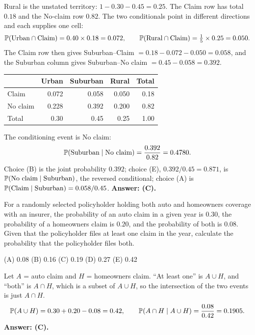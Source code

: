 \begin{solution}
Rural is the unstated territory: $1 - 0.30 - 0.45 = 0.25$. The Claim row has
total $0.18$ and the No-claim row $0.82$. The two conditionals point in
different directions and each supplies one cell:
\[
\mathbb{P}(\text{Urban} \cap \text{Claim}) = 0.40 \times 0.18 = 0.072, \qquad
\mathbb{P}(\text{Rural} \cap \text{Claim}) = \tfrac{1}{5} \times 0.25 = 0.050 .
\]
The Claim row then gives Suburban--Claim $= 0.18 - 0.072 - 0.050 = 0.058$, and
the Suburban column gives Suburban--No claim $= 0.45 - 0.058 = 0.392$.

\begin{center}
\begin{tabular}{@{}lrrrr@{}}
\toprule
 & Urban & Suburban & Rural & Total \\
\midrule
Claim    & 0.072 & 0.058 & 0.050 & 0.18 \\
No claim & 0.228 & 0.392 & 0.200 & 0.82 \\
\midrule
Total    & 0.30  & 0.45  & 0.25  & 1.00 \\
\bottomrule
\end{tabular}
\end{center}

The conditioning event is No claim:
\[
\mathbb{P}(\text{Suburban} \mid \text{No claim}) = \frac{0.392}{0.82} = 0.4780 .
\]
Choice (B) is the joint probability $0.392$; choice (E), $0.392/0.45 = 0.871$,
is $\mathbb{P}(\text{No claim} \mid \text{Suburban})$, the reversed conditional;
choice (A) is $\mathbb{P}(\text{Claim} \mid \text{Suburban}) = 0.058/0.45$.
\textbf{Answer: (C).}
\end{solution}

\begin{example}
For a randomly selected policyholder holding both auto and homeowners coverage
with an insurer, the probability of an auto claim in a given year is $0.30$, the
probability of a homeowners claim is $0.20$, and the probability of both is
$0.08$. Given that the policyholder files at least one claim in the year,
calculate the probability that the policyholder files both.

\medskip
(A) 0.08 \quad (B) 0.16 \quad (C) 0.19 \quad (D) 0.27 \quad (E) 0.42
\end{example}

\begin{solution}
Let $A$ = auto claim and $H$ = homeowners claim. ``At least one'' is $A \cup H$,
and ``both'' is $A \cap H$, which is a subset of $A \cup H$, so the intersection
of the two events is just $A \cap H$.
\[
\mathbb{P}(A \cup H) = 0.30 + 0.20 - 0.08 = 0.42, \qquad
\mathbb{P}(A \cap H \mid A \cup H) = \frac{0.08}{0.42} = 0.1905 .
\]
\textbf{Answer: (C).}
\end{solution}

